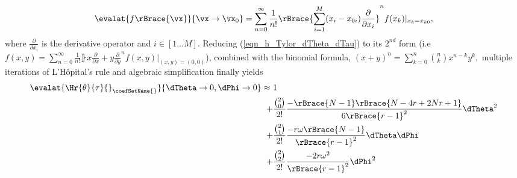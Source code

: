 {    \begin{equation}
        \label{eqn_h_Tylor_dTheta_dTau}
        \evalat{f\rBrace{\vx}}{\vx\to\vx_{0}}=\sum_{n=0}^{\infty}\frac{1}{n!}\rBrace{\sum_{i=1}^{M}(x_{i}-x_{0i})\frac {\partial}{\partial x_i} }^n f(x_k)|_{x_k=x_{k0}},
    \end{equation}
    where $\frac{\partial}{\partial x_i}$ is the derivative operator and $i\in\left[1\hdots{}M\right]$. Reducing (\ref{eqn_h_Tylor_dTheta_dTau}) to its $2^{nd}$ form (i.e $f(x,y)=\sum_{n=0}^{\infty} \frac 1 {n!}\rBrace{x\frac {\partial}{\partial x}+y\frac {\partial}{\partial y} }^n f(x,y)|_{(x,y)=(0,0)}$), combined with the binomial formula, $(x+y)^{n}=\sum _{k=0}^{n}{\binom {n}{k}}x^{n-k}y^{k},$ multiple iterations of L'Hôpital's rule and algebraic simplification finally yields
    \begin{equation}
        \begin{split}
            \evalat{\Hr{\theta}{\tau}{}_{\coefSetName{}}}{\dTheta\to0,\dPhi\to0} \approx\ & 1 
            \\+&\frac{\binom{2}{0}}{2!}\frac{-\rBrace{N - 1}\rBrace{N-4r+2Nr+1}}{6\rBrace{r-1}^{2}}\dTheta^{2}
            \\+&\frac{\binom{2}{1}}{2!}\frac{-r\omega\rBrace{N - 1}}{\rBrace{r-1}^{2}}\dTheta\dPhi
            \\+&\frac{\binom{2}{2}}{2!}\frac{-2r\omega^{2}}{\rBrace{r-1}^{2}}\dPhi^{2}
        \end{split}
    \end{equation}
}
\else
\fi

